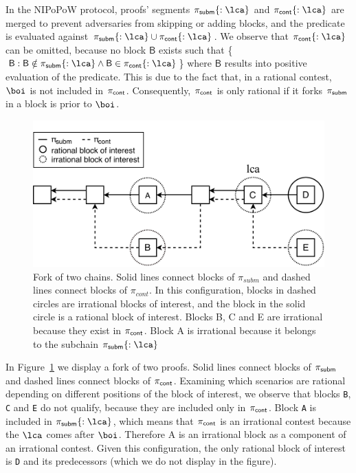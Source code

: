 \newcommand{\block}{\mathsf{B}}

In the NIPoPoW protocol, proofs' segments $\pis\{:\lca\}$ and $\pic\{:\lca\}$
are merged to prevent adversaries from skipping or adding blocks, and the
predicate is evaluated against $\pis\{:\lca\} \cup \pic\{:\lca\}$. We observe
that $\pic\{:\lca\}$ can be omitted, because no block $\block$ exists such that
\{$\block : \block \notin \pis\{:\lca\} \land \block \in \pic\{:\lca\}$\} where
$\block$ results into positive evaluation of the predicate. This is due to the
fact that, in a rational contest, $\boi$ is not included in $\mathsf{\pi_{cont}}$.
Consequently, $\mathsf{\pi_{cont}}$ is only rational if it forks $\mathsf{\pi_{subm}}$ in a block is prior
to $\boi$.

\renewcommand{\block}{}

\begin{figure}[h]
    \begin{center}
        \includegraphics[width=1\columnwidth]{figures/boi-position.pdf}
    \end{center}
    \caption{Fork of two chains. Solid lines connect blocks of $\pi_{subm}$
    and dashed lines connect blocks of $\pi_{cont}$. In this configuration,
    blocks in dashed circles are irrational blocks of interest, and the block
    in the solid circle is a rational block of interest. Blocks B, C and E are
    irrational because they exist in $\mathsf{\pi_{cont}}$. Block A is irrational because it
    belongs to the subchain $\pis\{:\lca\}$}
    \label{fig:boi-position}
\end{figure}

In Figure~\ref{fig:boi-position} we display a fork of two proofs. Solid lines
connect blocks of $\mathsf{\pi_{subm}}$ and dashed lines connect blocks of $\mathsf{\pi_{cont}}$.  Examining
which scenarios are rational depending on different positions of the block of
interest, we observe that blocks \texttt{B}, \texttt{C} and \texttt{E} do not
qualify, because they are included only in $\mathsf{\pi_{cont}}$. Block \texttt{A} is included
in $\pis\{:\lca\}$, which means that $\mathsf{\pi_{cont}}$ is an irrational contest because
the $\lca$ comes after $\boi$. Therefore A is an irrational block as a component
of an irrational contest. Given this configuration, the only rational block of
interest is \texttt{D} and its predecessors (which we do not display in the
figure).

